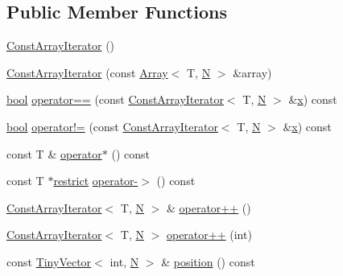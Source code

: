 \subsection*{Public Member Functions}
\begin{DoxyCompactItemize}
\item 
\hyperlink{classConstArrayIterator_a54d83e93a7716aa1694a9d4f914d4eb8}{Const\+Array\+Iterator} ()
\item 
\hyperlink{classConstArrayIterator_a09ffafc6ee2b896ba5b6dbc5200b74cf}{Const\+Array\+Iterator} (const \hyperlink{classArray}{Array}$<$ T, \hyperlink{polmisc_8c_a0240ac851181b84ac374872dc5434ee4}{N} $>$ \&array)
\item 
\hyperlink{compiler_8h_abb452686968e48b67397da5f97445f5b}{bool} \hyperlink{classConstArrayIterator_ad96d97e44397a8970a1692754624fc5e}{operator==} (const \hyperlink{classConstArrayIterator}{Const\+Array\+Iterator}$<$ T, \hyperlink{polmisc_8c_a0240ac851181b84ac374872dc5434ee4}{N} $>$ \&\hyperlink{vecnorm1_8cc_ac73eed9e41ec09d58f112f06c2d6cb63}{x}) const 
\item 
\hyperlink{compiler_8h_abb452686968e48b67397da5f97445f5b}{bool} \hyperlink{classConstArrayIterator_ad609dff30e75b1654e8ad1b067d668a6}{operator!=} (const \hyperlink{classConstArrayIterator}{Const\+Array\+Iterator}$<$ T, \hyperlink{polmisc_8c_a0240ac851181b84ac374872dc5434ee4}{N} $>$ \&\hyperlink{vecnorm1_8cc_ac73eed9e41ec09d58f112f06c2d6cb63}{x}) const 
\item 
const T \& \hyperlink{classConstArrayIterator_aec209032c8c11ec281037f73bc63b685}{operator$\ast$} () const 
\item 
const T $\ast$\hyperlink{compiler_8h_a080abdcb9c02438f1cd2bb707af25af8}{restrict} \hyperlink{classConstArrayIterator_a6227fca336d93818ddce62f4b34b4826}{operator-\/$>$} () const 
\item 
\hyperlink{classConstArrayIterator}{Const\+Array\+Iterator}$<$ T, \hyperlink{polmisc_8c_a0240ac851181b84ac374872dc5434ee4}{N} $>$ \& \hyperlink{classConstArrayIterator_ac79e9cdbe3ddde3e4330013e04bf03a2}{operator++} ()
\item 
\hyperlink{classConstArrayIterator}{Const\+Array\+Iterator}$<$ T, \hyperlink{polmisc_8c_a0240ac851181b84ac374872dc5434ee4}{N} $>$ \hyperlink{classConstArrayIterator_afc1c8f3a4a1b625b49be09897d904873}{operator++} (int)
\item 
const \hyperlink{classTinyVector}{Tiny\+Vector}$<$ int, \hyperlink{polmisc_8c_a0240ac851181b84ac374872dc5434ee4}{N} $>$ \& \hyperlink{classConstArrayIterator_a4be2f1a414f9714e0270d2c1be4fb714}{position} () const 
\end{DoxyCompactItemize}
